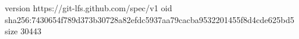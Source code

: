 version https://git-lfs.github.com/spec/v1
oid sha256:7430654f789d373b30728a82efdc5937aa79cacba9532201455f8d4cde625bd5
size 30443
